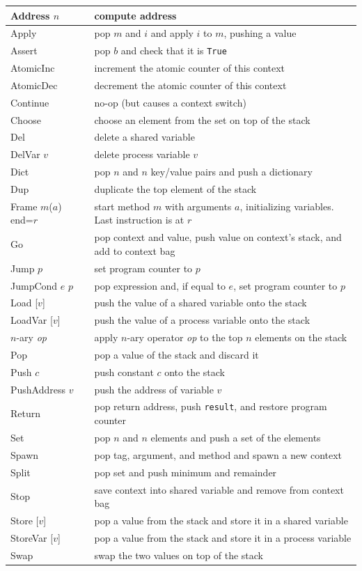 \documentclass{report}
\begin{document}
\vspace{1em}
\begin{tabular}{|l|l|}
\hline
Address $n$ & compute address \\
\hline
Apply & pop $m$ and $i$ and apply $i$ to $m$, pushing a value \\
\hline
Assert & pop $b$ and check that it is \texttt{True} \\
\hline
AtomicInc & increment the atomic counter of this context \\
\hline
AtomicDec & decrement the atomic counter of this context \\
\hline
Continue & no-op (but causes a context switch) \\
\hline
Choose & choose an element from the set on top of the stack \\
\hline
Del & delete a shared variable \\
\hline
DelVar $v$ & delete process variable $v$ \\
\hline
Dict & pop $n$ and $n$ key/value pairs and push a dictionary \\
\hline
Dup & duplicate the top element of the stack \\
\hline
Frame $m$($a$) end=$r$& start method $m$ with arguments $a$,
initializing variables.  Last instruction is at $r$ \\
\hline
Go & pop context and value, push value on context's stack, and add to context bag \\
\hline
Jump $p$ & set program counter to $p$ \\
\hline
JumpCond $e$ $p$ & pop expression and, if equal to $e$, set program counter to $p$ \\
\hline
Load [$v$] & push the value of a shared variable onto the stack \\
\hline
LoadVar [$v$] & push the value of a process variable onto the stack \\
\hline
$n$-ary \textit{op} & apply $n$-ary operator \textit{op} to the top $n$ elements on the stack \\
\hline
Pop & pop a value of the stack and discard it \\
\hline
Push $c$ & push constant $c$ onto the stack \\
\hline
PushAddress $v$ & push the address of variable $v$ \\
\hline
Return & pop return address, push \texttt{result}, and restore program counter \\
\hline
Set & pop $n$ and $n$ elements and push a set of the elements \\
\hline
Spawn & pop tag, argument, and method and spawn a new context \\
\hline
Split & pop set and push minimum and remainder \\
\hline
Stop & save context into shared variable and remove from context bag \\
\hline
Store [$v$] & pop a value from the stack and store it in a shared variable \\
\hline
StoreVar [$v$] & pop a value from the stack and store it in a process variable \\
\hline
Swap & swap the two values on top of the stack \\
\hline
\end{tabular}
\end{document}
